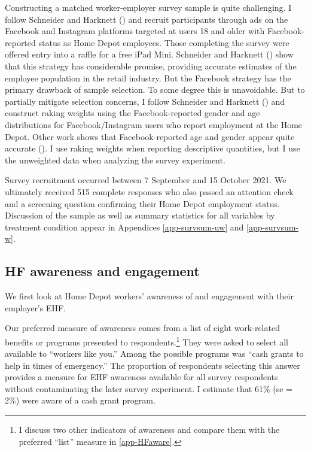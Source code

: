 \documentclass[
  11pt,
  oneside]{article}
\begin{document}
Constructing a matched worker-employer survey sample is quite challenging. I follow Schneider and Harknett () and recruit participants through ads on the Facebook and Instagram platforms targeted at users 18 and older with Facebook-reported status as Home Depot employees. Those completing the survey were offered entry into a raffle for a free iPad Mini. Schneider and Harknett () show that this strategy has considerable promise, providing accurate estimates of the employee population in the retail industry. But the Facebook strategy has the primary drawback of sample selection. To some degree this is unavoidable. But to partially mitigate selection concerns, I follow Schneider and Harknett () and construct raking weights using the Facebook-reported gender and age distributions for Facebook/Instagram users who report employment at the Home Depot. Other work shows that Facebook-reported age and gender appear quite accurate (). I use raking weights when reporting descriptive quantities, but I use the unweighted data when analyzing the survey experiment.

Survey recruitment occurred between 7 September and 15 October 2021. We ultimately received 515 complete responses who also passed an attention check and a screening question confirming their Home Depot employment status. Discussion of the sample as well as summary statistics for all variables by treatment condition appear in Appendices \ref{app-survsum-uw} and \ref{app-survsum-w}.

\subsection{HF awareness and engagement}\label{hf-awareness-and-engagement}

We first look at Home Depot workers' awareness of and engagement with their employer's EHF.

Our preferred measure of awareness comes from a list of eight work-related benefits or programs presented to respondents.\footnote{I discuss two other indicators of awareness and compare them with the preferred ``list'' measure in \ref{app-HFaware}.} They were asked to select all available to ``workers like you.'' Among the possible programs was ``cash grants to help in times of emergency.'' The proportion of respondents selecting this answer provides a measure for EHF awareness available for all survey respondents without contaminating the later survey experiment. I estimate that 61\% (se = 2\%) were aware of a cash grant program.
\end{document}
